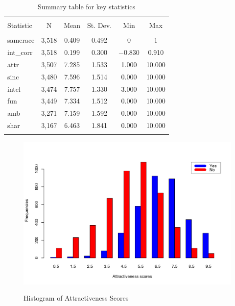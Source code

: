 \documentclass{article}
\begin{document}
\begin{table}[!htbp] \centering 
  \caption{Summary table for key statistics} 
  \label{fig:sum_table} 
\begin{tabular}{@{\extracolsep{5pt}}lccccc} 
\\[-1.8ex]\hline 
\hline \\[-1.8ex] 
Statistic & \multicolumn{1}{c}{N} & \multicolumn{1}{c}{Mean} & \multicolumn{1}{c}{St. Dev.} & \multicolumn{1}{c}{Min} & \multicolumn{1}{c}{Max} \\ 
\hline \\[-1.8ex] 
samerace & 3,518 & 0.409 & 0.492 & 0 & 1 \\ 
int\_corr & 3,518 & 0.199 & 0.300 & $-$0.830 & 0.910 \\ 
attr & 3,507 & 7.285 & 1.533 & 1.000 & 10.000 \\ 
sinc & 3,480 & 7.596 & 1.514 & 0.000 & 10.000 \\ 
intel & 3,474 & 7.757 & 1.330 & 3.000 & 10.000 \\ 
fun & 3,449 & 7.334 & 1.512 & 0.000 & 10.000 \\ 
amb & 3,271 & 7.159 & 1.592 & 0.000 & 10.000 \\ 
shar & 3,167 & 6.463 & 1.841 & 0.000 & 10.000 \\ 
\hline \\[-1.8ex] 
\end{tabular} 
\end{table} 
%
\begin{figure}[H]
	\caption{Histogram of Attractiveness Scores}
	\includegraphics[scale=0.50]{AttractivenessScores}
	\centering
	\label{fig:attractiveness}
\end{figure}
\end{document}
